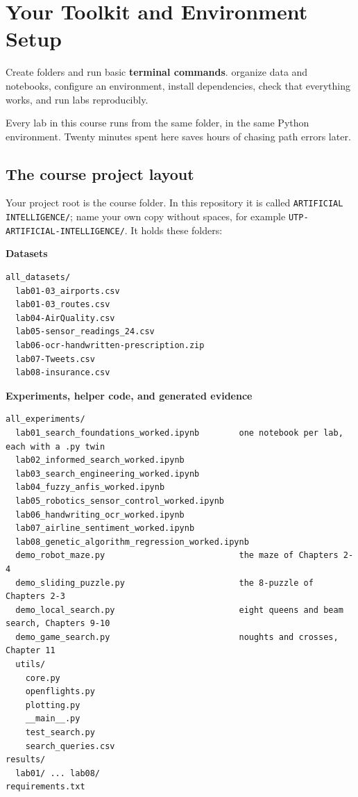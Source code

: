 \chapter{Your Toolkit and Environment Setup}
\label{ch:toolkit}

\chapterguide%
  {Create folders and run basic \textbf{terminal commands}.}
  {organize data and notebooks, configure an environment, install dependencies, check that everything works, and run labs reproducibly.}

Every lab in this course runs from the same folder, in the same Python environment. Twenty minutes spent here saves hours of chasing path errors later.

\section{The course project layout}

Your project root is the course folder. In this repository it is called \texttt{ARTIFICIAL INTELLIGENCE/}; name your own copy without spaces, for example \texttt{UTP-ARTIFICIAL-INTELLIGENCE/}. It holds these folders:

\noindent\textbf{Datasets}
\begin{lstlisting}[style=utpterminal]
all_datasets/
  lab01-03_airports.csv
  lab01-03_routes.csv
  lab04-AirQuality.csv
  lab05-sensor_readings_24.csv
  lab06-ocr-handwritten-prescription.zip
  lab07-Tweets.csv
  lab08-insurance.csv
\end{lstlisting}

\noindent\textbf{Experiments, helper code, and generated evidence}
\begin{lstlisting}[style=utpterminal]
all_experiments/
  lab01_search_foundations_worked.ipynb        one notebook per lab, each with a .py twin
  lab02_informed_search_worked.ipynb
  lab03_search_engineering_worked.ipynb
  lab04_fuzzy_anfis_worked.ipynb
  lab05_robotics_sensor_control_worked.ipynb
  lab06_handwriting_ocr_worked.ipynb
  lab07_airline_sentiment_worked.ipynb
  lab08_genetic_algorithm_regression_worked.ipynb
  demo_robot_maze.py                           the maze of Chapters 2-4
  demo_sliding_puzzle.py                       the 8-puzzle of Chapters 2-3
  demo_local_search.py                         eight queens and beam search, Chapters 9-10
  demo_game_search.py                          noughts and crosses, Chapter 11
  utils/
    core.py
    openflights.py
    plotting.py
    __main__.py
    test_search.py
    search_queries.csv
results/
  lab01/ ... lab08/
requirements.txt
\end{lstlisting}

